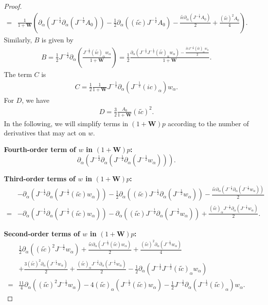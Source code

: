 \documentclass[10pt,a4paper]{amsart}
\newcommand{\al}{\alpha}
\newcommand{\bw}{\mathbf{W}}
\newcommand{\f}{\frac}
\newcommand{\p}{\partial}
\begin{document}
\begin{proof}
\begin{align*}
=&\f{1}{1+\mathbf{W}}\left(\p_{\al}(J^{-\f12}\p_{\al}(J^{-\f12}A_0))-\f12\p_{\al}\left((i\tilde{c})J^{-\f12}A_0\right)-\f{i\tilde{c}\p_{\al}(J^{-\f12}A_0)}{2}+\f{(i\tilde{c})^2A_0}{4}\right).
\end{align*}
Similarly, $B$ is given by
\begin{align*}
B=\f12J^{-\f12}\p_{\al}\left(\f{J^{-\f12}(i\tilde{c})_{\al}w_{\al}}{1+\mathbf{W}}\right)=\f12\f{\p_{\al}(J^{-\f12}J^{-\f12}(i\tilde{c})_{\al}w_{\al})-\f{i\tilde{c}J^{-\f12}(i\tilde{c})_{\al}w_{\al}}{2}}{1+\mathbf{W}}.
\end{align*}
The term $C$ is
\begin{align*}
C=\f12\f{1}{1+\mathbf{W}}J^{-\f12}\p_{\al}\left(J^{-\f12}(ic)_{\al}\right)w_{\al}.
\end{align*}
For $D$, we have
\begin{align*}
D=\f32\f{A_0}{1+\mathbf{W}}(i\tilde{c})^2.
\end{align*}
In the following, we will simplify terms in $(1+\bw)p$ according to the number of derivatives that may act on $w$.

{\bf{Fourth-order term of $w$ in $(1+\mathbf{W})p$}:}
\begin{equation*}
\p_{\al}(J^{-\f12}\p_{\al}(J^{-\f12}\p_{\al}(J^{-\f12}w_{\al}))).   
\end{equation*}

{\bf{Third-order terms of $w$ in $(1+\mathbf{W})p$:}}
\begin{align*}
&-\p_{\al}(J^{-\f12}\p_{\al}(J^{-\f12}(i\tilde{c})w_{\al}))
-\f12\p_{\al}\left((i\tilde{c})J^{-\f12}\p_{\al}(J^{-\f12}w_{\al})\right)
-\f{i\tilde{c}\p_{\al}(J^{-\f12}\p_{\al}(J^{-\f12}w_{\al}))}{2}\\
=&-\p_{\al}(J^{-\f12}\p_{\al}(J^{-\f12}(i\tilde{c})w_{\al}))
-\p_{\al}\left((i\tilde{c})J^{-\f12}\p_{\al}(J^{-\f12}w_{\al})\right)
+\f{(i\tilde{c})_{\al}J^{-\f12}\p_{\al}(J^{-\f12}w_{\al})}{2}.
\end{align*}

{\bf{Second-order terms of $w$ in $(1+\mathbf{W})p$:}}
\begin{align*}
&\f12\p_{\al}\left((i\tilde{c})^2J^{-\f12}w_{\al}\right)+\f{i\tilde{c}\p_{\al}(J^{-\f12}(i\tilde{c})w_{\al})}{2}+\f{(i\tilde{c})^2\p_{\al}(J^{-\f12}w_{\al})}{4}\\
&+\f{3(i\tilde{c})^2\p_{\al}(J^{-\f12}w_{\al})}{2}+\f{(i\tilde{c})_{\al}J^{-\f12}\p_{\al}(J^{-\f12}w_{\al})}{2}-\f12\p_{\al}(J^{-\f12}J^{-\f12}(i\tilde{c})_{\al}w_{\al})\\
=&\f{11}4\p_{\al}\left((i\tilde{c})^2J^{-\f12}w_{\al}\right)-4(i\tilde{c})_{\al}(J^{-\f12}(i\tilde{c})w_{\al})
-\f12J^{-\f12}\p_{\al}(J^{-\f12}(i\tilde{c})_{\al})w_{\al}.
\end{align*}



\end{proof}
\end{document}
